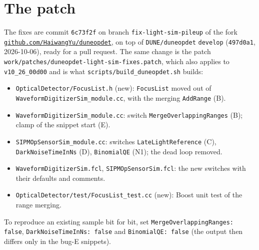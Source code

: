 \documentclass[10pt]{article}
\newcommand{\code}[1]{\texttt{#1}}
\newcommand{\fn}[1]{\nolinkurl{#1}}
\begin{document}
\section{The patch}
\label{app:patch}
The fixes are commit \code{6c73f2f} on branch \code{fix-light-sim-pileup} of the fork
\href{https://github.com/HaiwangYu/duneopdet/tree/fix-light-sim-pileup}{\code{github.com/HaiwangYu/duneopdet}},
on top of \code{DUNE/duneopdet} \code{develop} (\code{497d0a1}, 2026-10-06), ready for a pull request.
The same change is the patch \fn{work/patches/duneopdet-light-sim-fixes.patch}, which also applies to
\code{v10\_26\_00d00} and is what \fn{scripts/build_duneopdet.sh} builds:
\begin{itemize}
\item \code{OpticalDetector/FocusList.h} (new): \code{FocusList} moved out of \code{WaveformDigitizerSim\_module.cc},
  with the merging \code{AddRange} (B).
\item \code{WaveformDigitizerSim\_module.cc}: switch \code{MergeOverlappingRanges} (B); clamp of the snippet start (E).
\item \code{SIPMOpSensorSim\_module.cc}: switches \code{LateLightReference} (C), \code{DarkNoiseTimeInNs} (D),
  \code{BinomialQE} (N1); the dead loop removed.
\item \code{WaveformDigitizerSim.fcl}, \code{SIPMOpSensorSim.fcl}: the new switches with their defaults and comments.
\item \code{OpticalDetector/test/FocusList\_test.cc} (new): Boost unit test of the range merging.
\end{itemize}
To reproduce an existing sample bit for bit, set \code{MergeOverlappingRanges: false}, \code{DarkNoiseTimeInNs: false}
and \code{BinomialQE: false} (the output then differs only in the bug-E snippets).

\end{document}
